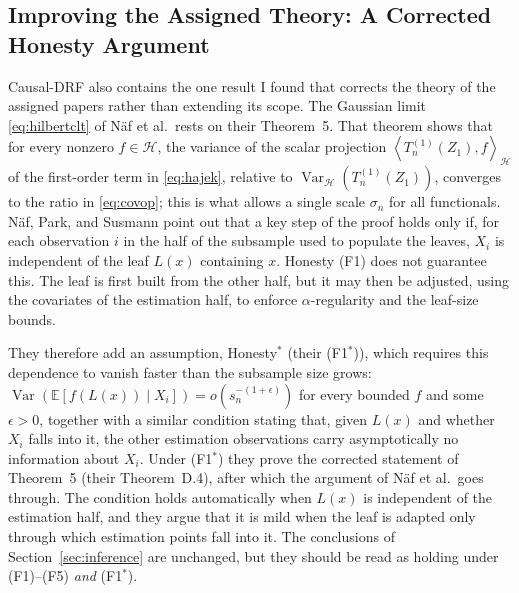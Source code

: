 \documentclass[12pt,a4paper]{article}
\newcommand{\E}{\mathbb E}
\newcommand{\calH}{\mathcal H}
\newcommand{\Var}{\operatorname{Var}}
\newcommand{\1}{\mathbf 1}
\newcommand{\ip}[2]{\left\langle#1,#2\right\rangle}
\begin{document}
\subsection{Improving the Assigned Theory: A Corrected Honesty Argument}\label{sec:prooffix}
Causal-DRF also contains the one result I found that corrects the theory of the assigned papers rather than extending its scope. The Gaussian limit \eqref{eq:hilbertclt} of N\"af et al.\ rests on their Theorem~5. That theorem shows that for every nonzero $f\in\calH$, the variance of the scalar projection $\ip{T_n^{(1)}(Z_1)}{f}_{\calH}$ of the first-order term in \eqref{eq:hajek}, relative to $\Var_{\calH}(T_n^{(1)}(Z_1))$, converges to the ratio in \eqref{eq:covop}; this is what allows a single scale $\sigma_n$ for all functionals. N\"af, Park, and Susmann \cite[Appendix~D]{nafpark2026} point out that a key step of the proof holds only if, for each observation $i$ in the half of the subsample used to populate the leaves, $X_i$ is independent of the leaf $L(x)$ containing $x$. Honesty (F1) does not guarantee this. The leaf is first built from the other half, but it may then be adjusted, using the covariates of the estimation half, to enforce $\alpha$-regularity and the leaf-size bounds.

They therefore add an assumption, Honesty$^*$ (their (F1$^*$)), which requires this dependence to vanish faster than the subsample size grows: $\Var(\E[f(L(x))\mid X_i])=o(s_n^{-(1+\epsilon)})$ for every bounded $f$ and some $\epsilon>0$, together with a similar condition stating that, given $L(x)$ and whether $X_i$ falls into it, the other estimation observations carry asymptotically no information about $X_i$. Under (F1$^*$) they prove the corrected statement of Theorem~5 (their Theorem~D.4), after which the argument of N\"af et al.\ goes through. The condition holds automatically when $L(x)$ is independent of the estimation half, and they argue that it is mild when the leaf is adapted only through which estimation points fall into it. The conclusions of Section~\ref{sec:inference} are unchanged, but they should be read as holding under (F1)--(F5) \emph{and} (F1$^*$).
\end{document}
